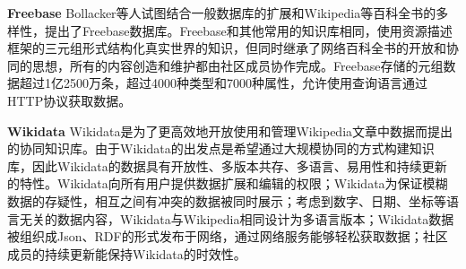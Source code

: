 \begin{comment}
Wu等人在TEXTRUNNER的基础上提出了WOE开放信息提取系统\citing{wu2010open}。WOE改进了自监督学习方式用于构建提取器，TEXTRUNNER在提取过程中使用解析器直接从语料库中提取（实体，关系，实体）的三元组数据，而WOE则先从Wikipedia的信息框中提取“属性-值”对，再使用匹配器从文章中找到包含文章主语和“属性-值”对的句子作为语料库中的训练数据。随后测试了两种解析方法的提取器：WOE-parse和WOE-pos，WOE-pos使用和TEXTRUNNER类似的解析方法，根据简单的词性标签，从语料库中的句子解析出（实体，关系，实体）的数据，WOE-parse则选择更复杂的依赖解析树，希望能再复杂长句的解析中得到更好的精确度。

开放信息提取系统会对每个输出的三元组数据给定一个置信度，如果给定一个置信度的下限，高置信度的数据被保留，低置信度的数据被过滤，此时可以通过精确度和召回率测试系统的性能。精确度是指保留的数据中正确的数据所占比例，能反映整体精确度的平均水平。召回率是指保留的数据中正确的数据占所有正确数据的比例，能反映正确的数据在不同置信度的分布情况。

实验分析显示，因为使用了更友好的训练数据，WOE-pos在精确度上更优于TEXTRUNNER，而WOE-parse在解析树的帮助下实现了最好的性能，特别是在召回率上。

Fader等人在分析TEXTRUNNER和WOE的结果之后发现，不连贯提取和无信息提取两种错误频繁出现。不连贯提取是指被提取的关系语句由多词组成，但语义不连贯而无意义。无信息提取是指提取内容忽略了句子的关键信息，例如，“父亲对母亲做出承诺”，系统返回无信息的（父亲，做出，承诺）而不是（父亲，做出承诺对，母亲）。以上的两种错误都是由系统不能提取出具有完整句法结构的关系语句造成的，Fader等人在Open IE系统中引入了一定的句法限制，提出了REVERB开放信息提取系统\citing{fader2011identifying}。30\%的REVERB提取数据的概率标签在0.8或更高，相较起TEXTRUNNER的0.13\%，在精确度上实现了越阶式的增长，不连贯提取和无信息提取的错误率也大幅减少。
\end{comment}

\textbf{Freebase}
Bollacker等人试图结合一般数据库的扩展和Wikipedia等百科全书的多样性，提出了Freebase数据库。Freebase和其他常用的知识库相同，使用资源描述框架的三元组形式结构化真实世界的知识，但同时继承了网络百科全书的开放和协同的思想，所有的内容创造和维护都由社区成员协作完成。Freebase存储的元组数据超过1亿2500万条，超过4000种类型和7000种属性，允许使用查询语言通过HTTP协议获取数据。

\textbf{Wikidata}
Wikidata是为了更高效地开放使用和管理Wikipedia文章中数据而提出的协同知识库。由于Wikidata的出发点是希望通过大规模协同的方式构建知识库，因此Wikidata的数据具有开放性、多版本共存、多语言、易用性和持续更新的特性。Wikidata向所有用户提供数据扩展和编辑的权限；Wikidata为保证模糊数据的存疑性，相互之间有冲突的数据被同时展示；考虑到数字、日期、坐标等语言无关的数据内容，Wikidata与Wikipedia相同设计为多语言版本；Wikidata数据被组织成Json、RDF的形式发布于网络，通过网络服务能够轻松获取数据；社区成员的持续更新能保持Wikidata的时效性。

